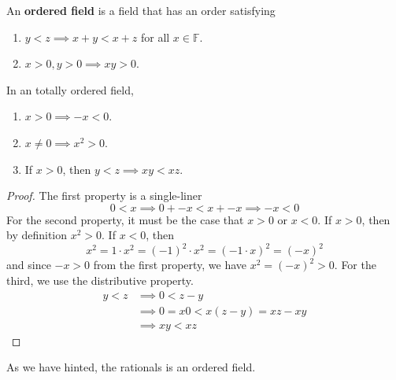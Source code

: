 \documentclass{article}
\begin{document}
      \begin{definition}
        An \textbf{ordered field} is a field that has an order satisfying 
        \begin{enumerate}
          \item $y < z \implies x + y < x + z$ for all $x \in \mathbb{F}$. 
          \item $x > 0, y > 0 \implies xy > 0$. 
        \end{enumerate}
      \end{definition}

      \begin{theorem}[Properties]
        In an totally ordered field, 
        \begin{enumerate}
          \item $x > 0 \implies -x < 0$. 
          \item $x \neq 0 \implies x^2 > 0$. 
          \item If $x > 0$, then $y < z \implies xy < xz$. 
        \end{enumerate}
      \end{theorem} 
      \begin{proof}
        The first property is a single-liner 
        \begin{equation}
          0 < x \implies 0 + -x < x + -x \implies -x < 0 
        \end{equation}
        For the second property, it must be the case that $x > 0$ or $x < 0$. If $x > 0$, then by definition $x^2 > 0$. If $x < 0$, then 
        \begin{equation}
          x^2 = 1 \cdot x^2 = (-1)^2 \cdot x^2 = (-1 \cdot x)^2 = (-x)^2
        \end{equation}
        and since $-x > 0$ from the first property, we have $x^2 = (-x)^2 > 0$. For the third, we use the distributive property. 
        \begin{align}
          y < z & \implies 0 < z - y \\ 
                & \implies 0 = x 0 < x(z - y) = xz - xy \\
                & \implies xy < xz
        \end{align}
      \end{proof}

      As we have hinted, the rationals is an ordered field. 
\end{document}
